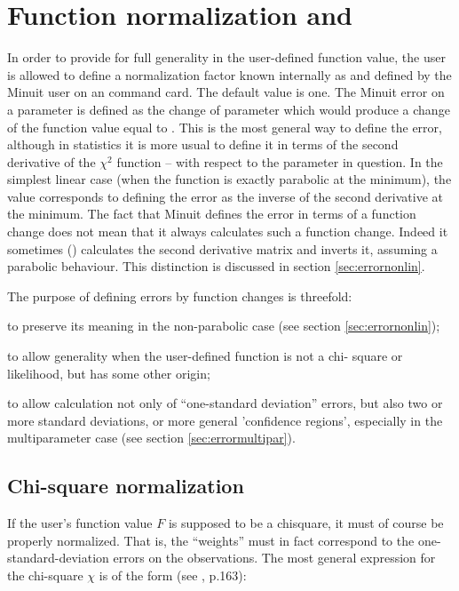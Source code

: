 \section{Function normalization and \protect{}}
 
In order to provide for full generality in the user-defined function 
value, the user is allowed to define a normalization factor known 
internally as  and defined by the Minuit user on an 
 command card. 
The default value is one. The Minuit error on a 
parameter is defined as the change of parameter which would 
produce a change of the function value equal to . 
This is the most 
general way to define the error, although in statistics it is more 
usual to define it in terms of the second derivative of the $\chi^2$
function -- with respect to the parameter in question. In the 
simplest linear case (when the function is exactly parabolic at the 
minimum), the value  corresponds to defining the error as the 
inverse of the second derivative at the minimum. The fact that 
Minuit defines the error in terms of a function change does not mean 
that it always calculates such a function change. Indeed it 
sometimes () calculates the second derivative matrix and 
inverts it, assuming a parabolic behaviour. This distinction is 
discussed in section \ref{sec:errornonlin}.
 
The purpose of defining errors by function changes is threefold: 

\begin{OL}
\item to preserve its meaning in the non-parabolic case 
      (see section \ref{sec:errornonlin});
\item to allow generality when the user-defined function is not a chi-
      square or likelihood, but has some other origin;
\item to allow calculation not only of ``one-standard deviation'' errors, 
      but also two or more standard deviations, or more general 
      'confidence regions', especially in the multiparameter case 
      (see section \ref{sec:errormultipar}).
\end{OL}
 
\subsection{Chi-square normalization}
 
If the user's function value $F$ is supposed to be a chisquare, it must 
of course be properly normalized. That is, the ``weights'' must in fact 
correspond to the one-standard-deviation errors on the observations. 
The most general expression for the chi-square $\chi$ is of 
the form (see \cite{bib-EADIE}, p.163):
 
